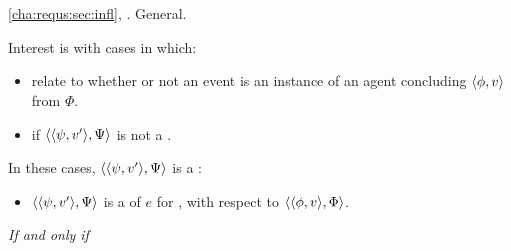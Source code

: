 \section{}
\label{cha:requs:sec:definition}

\begin{note}
  \autoref{cha:requs:sec:infl}, \ninf{}.
  General.

  Interest is with cases in which:
  \begin{itemize}
  \item
    \ninf{} relate to whether or not an event is an instance of an agent concluding \(\langle \phi, v \rangle\) from \(\Phi\).
  \item
    \ninf{} if \(\langle \langle \psi, v' \rangle, \Psi \rangle\) is not a \fc{}.
  \end{itemize}

  In these cases, \(\langle \langle \psi, v' \rangle, \Psi \rangle\) is a \requ{}:

  \begin{definition}[A \requ{0}]
    \label{def:requ}

    \begin{itemize}
    \item
      \(\langle \langle \psi, v' \rangle, \Psi \rangle\) is a \emph{\requ{}} of \(e\) for \vAgent{}, with respect to \(\langle \langle \phi, v \rangle, \Phi \rangle\).
    \end{itemize}

    \emph{If and only if}


\end{definition}
\end{note}
